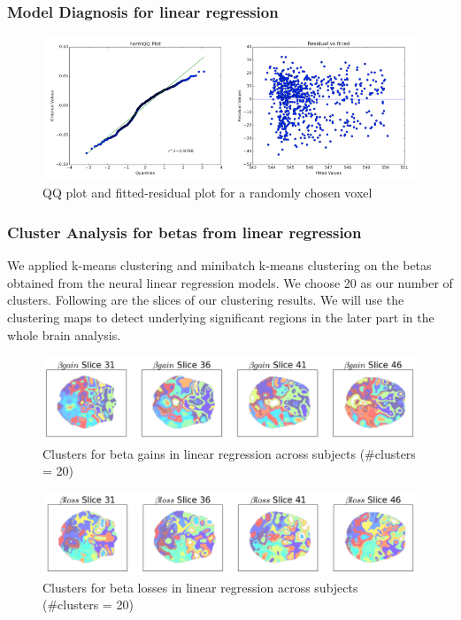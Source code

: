 \documentclass[11pt]{article}
\begin{document}
\subsubsection{Model Diagnosis for linear regression}

\begin{figure}[H]
    \centering
        \includegraphics[scale=0.4]{figures/Regression2/diagnosis.png}
    \caption{QQ plot and fitted-residual plot for a randomly chosen voxel}
\end{figure}

\subsubsection{Cluster Analysis for betas from linear regression}

We applied k-means clustering and minibatch k-means clustering on the betas obtained from the neural linear regression models. We choose 20 as our number of clusters. Following are the slices of our clustering results. We will use the clustering maps to detect underlying significant regions in the later part in the whole brain analysis.

\begin{figure}[H]
    \centering
        \includegraphics[scale=0.4]{figures/Regression2/beta_gain_cluster.png}
    \caption{Clusters for beta gains in linear regression across subjects (\#clusters = 20)}
\end{figure}

\begin{figure}[H]
    \centering
        \includegraphics[scale=0.4]{figures/Regression2/beta_loss_cluster.png}
    \caption{Clusters for beta losses in linear regression across subjects (\#clusters = 20)}
\end{figure}
\end{document}
